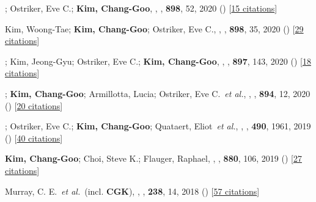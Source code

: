 \item[{22.}]; Ostriker, Eve C.; \textbf{Kim, Chang-Goo}, , \apj, \textbf{898}, 52, 2020 () [\href{http://adsabs.harvard.edu/abs/2020ApJ...898...52M}{15 citations}]

\item[{21.}]Kim, Woong-Tae; \textbf{Kim, Chang-Goo}; Ostriker, Eve C., , \apj, \textbf{898}, 35, 2020 () [\href{http://adsabs.harvard.edu/abs/2020ApJ...898...35K}{29 citations}]

\item[{20.}]; Kim, Jeong-Gyu; Ostriker, Eve C.; \textbf{Kim, Chang-Goo}, , \apj, \textbf{897}, 143, 2020 () [\href{http://adsabs.harvard.edu/abs/2020ApJ...897..143K}{18 citations}]

\item[{19.}]; \textbf{Kim, Chang-Goo}; Armillotta, Lucia; Ostriker, Eve C.~\textit{et al.}, , \apj, \textbf{894}, 12, 2020 () [\href{http://adsabs.harvard.edu/abs/2020ApJ...894...12V}{20 citations}]

\item[{18.}]; Ostriker, Eve C.; \textbf{Kim, Chang-Goo}; Quataert, Eliot~\textit{et al.}, , \mnras, \textbf{490}, 1961, 2019 () [\href{http://adsabs.harvard.edu/abs/2019MNRAS.490.1961E}{40 citations}]

\item[{17.}]\textbf{Kim, Chang-Goo}; Choi, Steve K.; Flauger, Raphael, , \apj, \textbf{880}, 106, 2019 () [\href{http://adsabs.harvard.edu/abs/2019ApJ...880..106K}{27 citations}]

\item[{16.}]Murray, C. E.~\textit{et al.}~(incl. \textbf{CGK}), , \apjs, \textbf{238}, 14, 2018 () [\href{http://adsabs.harvard.edu/abs/2018ApJS..238...14M}{57 citations}]

